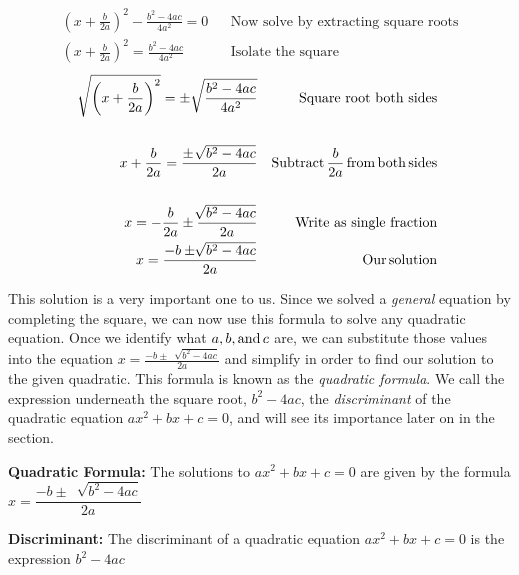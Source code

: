 \begin{example}
\begin{eqnarray*}
		& & \\
    \left( x + \frac{b}{2a}\right)^2-\frac{b^2 - 4 a c}{4 a^2}=0 & & \text{Now~solve~by~extracting~square~roots}\\
    \left( x + \frac{b}{2a}\right)^2=\frac{b^2 - 4 a c}{4 a^2} & & \text{Isolate~the~square}	\end{eqnarray*}
	\begin{eqnarray*}
    \sqrt[]{\left( x + \frac{b}{2 a} \right)^2} = \pm \sqrt{\frac{b^2 - 4 ac}{4 a^2}} &  & \operatorname{Square~root~both~sides}\\
    &  & \\
    x + \frac{b}{2 a} = \frac{\pm~ \sqrt[]{b^2 - 4 a c}}{2 a} &  & \operatorname{Subtract} \frac{b}{2 a} \operatorname{from} \operatorname{both} \operatorname{sides}\\
    &  & \\
    x = -\frac{b}{2a} \pm \frac{\sqrt[]{b^2 - 4 a c}}{2 a}&  & \text{Write as single fraction}\\
    x=\frac{- b \pm \sqrt[]{b^2 - 4 a c}}{2 a} & &  \operatorname{Our} \operatorname{solution}
	\end{eqnarray*}
\end{example}


This solution is a very important one to us. Since we solved a \textit{general} equation
by completing the square, we can now use this formula to solve any quadratic
equation. Once we identify what $a, b, \operatorname{and} c$ are, we
can substitute those values into the equation $x = \frac{- b \pm~ \sqrt[]{b^2 - 4
ac}}{2 a}$ and simplify in order to find our solution to the given quadratic. This formula is known as
the \textit{quadratic formula}.  We call the expression underneath the square root, $b^2 - 4ac$, the \textit{discriminant} of the quadratic equation $ax^2+bx+c=0$, and will see its importance later on in the section.\pp

{\bf Quadratic Formula:} The solutions to $ax^2+bx+c=0$ are given by the formula $x = \dfrac{- b \pm~ \sqrt[]{b^2 - 4 a c}}{2 a}$\pp

{\bf Discriminant:} The discriminant of a quadratic equation $ax^2+bx+c=0$ is the expression  $b^2 - 4 a c$\pp



	
